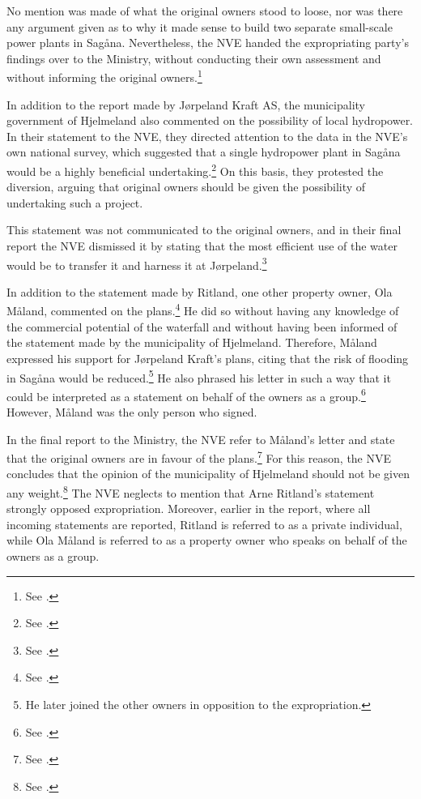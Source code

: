 No mention was made of what the original owners stood to loose, nor was there any argument given as to why it made sense to build two separate small-scale power plants in Sagåna. Nevertheless, the NVE handed the expropriating party's findings over to the Ministry, without conducting their own assessment and without informing the original owners.\footnote{See \cite[22-23]{jorpeland09}.}

In addition to the report made by Jørpeland Kraft AS, the municipality government of Hjelmeland also commented on the possibility of local hydropower. In their statement to the NVE, they directed attention to the data in the NVE's own national survey, which suggested that a single hydropower plant in Sagåna would be a highly beneficial undertaking.\footnote{See \cite[19]{jorpeland09}.} On this basis, they protested the diversion, arguing that original owners should be given the possibility of undertaking such a project.

This statement was not communicated to the original owners, and in their final report the NVE dismissed it by stating that the most efficient use of the water would be to transfer it and harness it at Jørpeland.\footnote{See \cite[19]{jorpeland09}.}

In addition to the statement made by Ritland, one other property owner, Ola Måland, commented on the plans.\footnote{See \cite[17]{jorpeland09}.} He did so without having any knowledge of the commercial potential of the waterfall and without having been informed of the statement made by the municipality of Hjelmeland. Therefore, Måland expressed his support for Jørpeland Kraft's plans, citing that the risk of flooding in Sagåna would be reduced.\footnote{He later joined the other owners in opposition to the expropriation.} He also phrased his letter in such a way that it could be interpreted as a statement on behalf of the owners as a group.\footnote{See \cite[17]{jorpeland09}.} However, Måland was the only person who signed.

In the final report to the Ministry, the NVE refer to Måland's letter and state that the original owners are in favour of the plans.\footnote{See \cite[19]{jorpeland09}.} For this reason, the NVE concludes that the opinion of the municipality of Hjelmeland should not be given any weight.\footnote{See \cite[19]{jorpeland09}.} The NVE neglects to mention that Arne Ritland's statement strongly opposed expropriation. Moreover, earlier in the report, where all incoming statements are reported, Ritland is referred to as a private individual, while Ola Måland is referred to as a property owner who speaks on behalf of the owners as a group.

